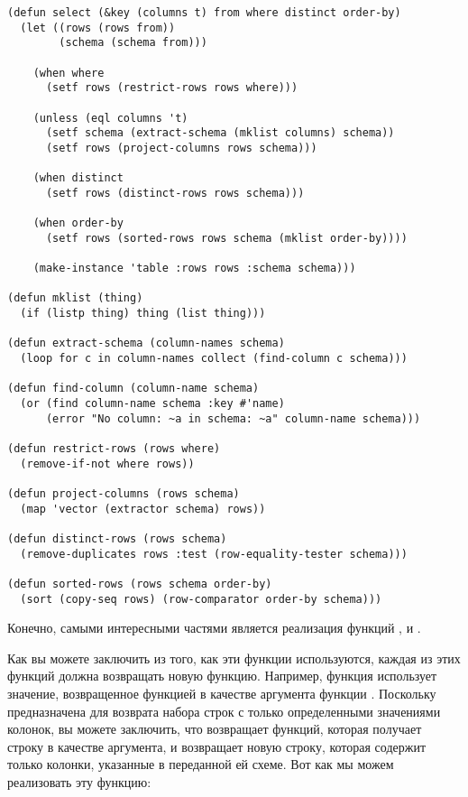 \begin{lstlisting}
(defun select (&key (columns t) from where distinct order-by)
  (let ((rows (rows from))
        (schema (schema from)))

    (when where
      (setf rows (restrict-rows rows where)))

    (unless (eql columns 't)
      (setf schema (extract-schema (mklist columns) schema))
      (setf rows (project-columns rows schema)))

    (when distinct
      (setf rows (distinct-rows rows schema)))

    (when order-by
      (setf rows (sorted-rows rows schema (mklist order-by))))

    (make-instance 'table :rows rows :schema schema)))

(defun mklist (thing)
  (if (listp thing) thing (list thing)))

(defun extract-schema (column-names schema)
  (loop for c in column-names collect (find-column c schema)))

(defun find-column (column-name schema)
  (or (find column-name schema :key #'name)
      (error "No column: ~a in schema: ~a" column-name schema)))

(defun restrict-rows (rows where)
  (remove-if-not where rows))

(defun project-columns (rows schema)
  (map 'vector (extractor schema) rows))

(defun distinct-rows (rows schema)
  (remove-duplicates rows :test (row-equality-tester schema)))

(defun sorted-rows (rows schema order-by)
  (sort (copy-seq rows) (row-comparator order-by schema)))
\end{lstlisting}

Конечно, самыми интересными частями  является реализация функций
,  и .

Как вы можете заключить из того, как эти функции используются, каждая из этих функций
должна возвращать новую функцию.  Например, функция  использует
значение, возвращенное функцией  в качестве аргумента функции .
Поскольку  предназначена для возврата набора строк с только
определенными значениями колонок, вы можете заключить, что  возвращает
функций, которая получает строку в качестве аргумента, и возвращает новую строку, которая
содержит только колонки, указанные в переданной ей схеме.  Вот как мы можем реализовать
эту функцию:

